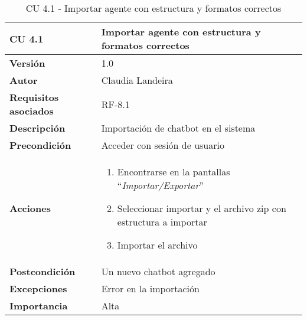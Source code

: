 \begin{table}[p]
	\centering
	\begin{tabularx}{\linewidth}{ p{} p{} }
		\toprule
		\textbf{CU 4.1}    & \textbf{Importar agente con estructura y formatos correctos}\\
		\toprule
		\textbf{Versión}              & 1.0    \\
		\textbf{Autor}                & Claudia Landeira \\
		\textbf{Requisitos asociados} & RF-8.1\\
		\textbf{Descripción}          & Importación de chatbot en el sistema\\
		\textbf{Precondición}         & Acceder con sesión de usuario\\
		\textbf{Acciones}             &
		\begin{enumerate}
			\def\labelenumi{\arabic{enumi}.}
			\tightlist
                \item Encontrarse en la pantallas ``\textit{Importar/Exportar}''
			\item Seleccionar importar y el archivo zip con estructura a importar
			\item Importar el archivo
		\end{enumerate}\\
		\textbf{Postcondición}        & Un nuevo chatbot agregado \\
		\textbf{Excepciones}          & Error en la importación \\
		\textbf{Importancia}          & Alta \\
		\bottomrule
	\end{tabularx}
	\caption{CU 4.1 - Importar agente con estructura y formatos correctos}
\end{table}

